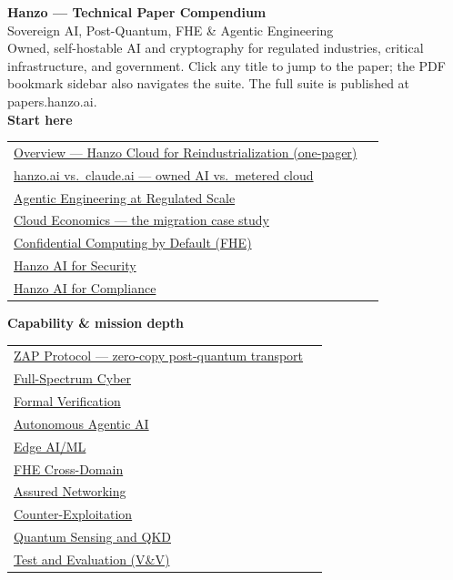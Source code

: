 \documentclass[letterpaper]{article}
\begin{document}
\thispagestyle{empty}
{\Large\bfseries Hanzo --- Technical Paper Compendium}\\[2pt]
{\large Sovereign AI, Post-Quantum, FHE \& Agentic Engineering}\\[1.5em]
{\footnotesize\color{gray}Owned, self-hostable AI and cryptography for regulated industries, critical
infrastructure, and government. Click any title to jump to the paper; the PDF bookmark sidebar also navigates
the suite. The full suite is published at papers.hanzo.ai.}\\[1.5em]

\textbf{Start here}\\[0.4em]
\begin{tabular}{@{}p{0.96\linewidth}@{}}
\hyperref[c00]{Overview --- Hanzo Cloud for Reindustrialization (one-pager)}\\[0.3em]
\hyperref[c01]{hanzo.ai vs.\ claude.ai --- owned AI vs.\ metered cloud}\\[0.3em]
\hyperref[c02]{Agentic Engineering at Regulated Scale}\\[0.3em]
\hyperref[c03]{Cloud Economics --- the migration case study}\\[0.3em]
\hyperref[c04]{Confidential Computing by Default (FHE)}\\[0.3em]
\hyperref[c05]{Hanzo AI for Security}\\[0.3em]
\hyperref[c06]{Hanzo AI for Compliance}\\[0.8em]
\end{tabular}

\textbf{Capability \& mission depth}\\[0.4em]
\begin{tabular}{@{}p{0.96\linewidth}@{}}
\hyperref[c07]{ZAP Protocol --- zero-copy post-quantum transport}\\[0.3em]
\hyperref[c08]{Full-Spectrum Cyber}\\[0.3em]
\hyperref[c09]{Formal Verification}\\[0.3em]
\hyperref[c10]{Autonomous Agentic AI}\\[0.3em]
\hyperref[c11]{Edge AI/ML}\\[0.3em]
\hyperref[c12]{FHE Cross-Domain}\\[0.3em]
\hyperref[c13]{Assured Networking}\\[0.3em]
\hyperref[c14]{Counter-Exploitation}\\[0.3em]
\hyperref[c15]{Quantum Sensing and QKD}\\[0.3em]
\hyperref[c16]{Test and Evaluation (V\&V)}\\[0.3em]
\end{tabular}
\end{document}
